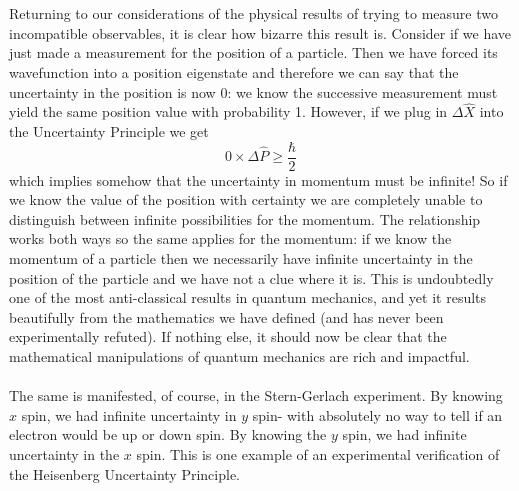 \\\\
Returning to our considerations of the physical results of trying to measure two incompatible observables, it is clear how bizarre this result is. Consider if we have just made a measurement for the position of a particle. Then we have forced its wavefunction into a position eigenstate and therefore we can say that the uncertainty in the position is now $0$: we know the successive measurement must yield the same position value with probability 1. However, if we plug in $\Delta{\hat{X}}$ into the Uncertainty Principle we get 
$$
0\times\Delta\hat{P}\geq\frac{\hbar}{2}
$$
which implies somehow that the uncertainty in momentum must be infinite! So if we know the value of the position with certainty we are completely unable to distinguish between infinite possibilities for the momentum. The relationship works both ways so the same applies for the momentum: if we know the momentum of a particle then we necessarily have infinite uncertainty in the position of the particle and we have not a clue where it is. This is undoubtedly one of the most anti-classical results in quantum mechanics, and yet it results beautifully from the mathematics we have defined (and has never been experimentally refuted). If nothing else, it should now be clear that the mathematical manipulations of quantum mechanics are rich and impactful.
\\\\
The same is manifested, of course, in the Stern-Gerlach experiment. By knowing $x$ spin, we had infinite uncertainty in $y$ spin- with absolutely no way to tell if an electron would be up or down spin. By knowing the $y$ spin, we had infinite uncertainty in the $x$ spin. This is one example of an experimental verification of the Heisenberg Uncertainty Principle.
